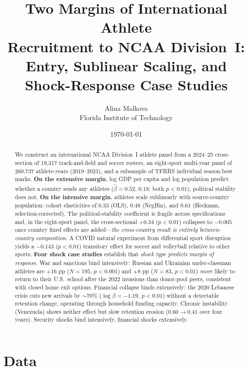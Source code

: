\documentclass[11pt]{article}
\title{Two Margins of International Athlete\\Recruitment to NCAA Division~I:\\
Entry, Sublinear Scaling, and Shock-Response Case Studies}
\author{Alina Malkova\\Florida Institute of Technology}
\date{\today}
\begin{document}
\maketitle

\begin{abstract}
We construct an international NCAA Division~I athlete panel from a
2024--25 cross-section of 19{,}317 track-and-field and soccer
rosters, an eight-sport multi-year panel of 260{,}737 athlete-years
(2019--2023), and a subsample of TFRRS individual season-best
marks. \textbf{On the extensive margin}, log GDP per capita and log
population predict whether a country sends any athletes
($\hat\beta=0.52$, $0.18$; both $p<0.01$); political stability does
not. \textbf{On the intensive margin}, athletes scale sublinearly
with source-country population: cohort elasticities of $0.33$ (OLS),
$0.48$ (NegBin), and $0.61$ (Heckman, selection-corrected). The
political-stability coefficient is fragile across specifications
and, in the eight-sport panel, the cross-sectional
$+0.34$ ($p<0.01$) collapses to $-0.005$ once country fixed effects
are added---\emph{the cross-country result is entirely
between-country composition}. A COVID natural experiment from
differential sport disruption yields a $-0.143$ ($p<0.01$) transitory
effect for soccer and volleyball relative to other sports.
\textbf{Four shock case studies} establish that
\emph{shock type predicts margin of response}. War and sanctions
bind intensively: Russian and Ukrainian under-classman athletes are
$+16$ pp ($N{=}195$, $p<0.001$) and $+8$ pp ($N{=}83$, $p<0.01$)
\emph{more} likely to return to their U.S.\ school after the 2022
invasions than donor-pool peers, consistent with closed home exit
options. Financial collapse binds extensively: the 2020 Lebanese
crisis cuts new arrivals by $\sim 70\%$ ($\log\beta = -1.19$,
$p<0.01$) without a detectable retention change, operating through
household funding capacity. Chronic instability (Venezuela) shows
neither effect but slow retention erosion ($0.60 \to 0.41$ over
four years). Security shocks bind intensively, financial shocks
extensively.
\end{abstract}

\section{Data}
\end{document}

